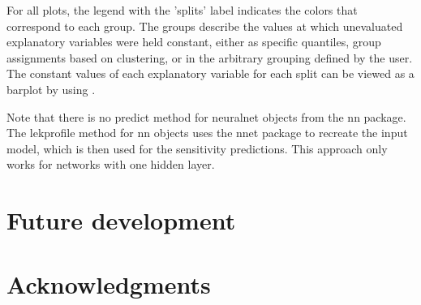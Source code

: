 \documentclass[article]{jss}\usepackage[]{graphicx}\usepackage[]{color}
\begin{document}
For all plots, the legend with the 'splits' label indicates the colors that correspond to each group. The groups describe the values at which unevaluated explanatory variables were held constant, either as specific quantiles, group assignments based on clustering, or in the arbitrary grouping defined by the user. The constant values of each explanatory variable for each split can be viewed as a barplot by using .

Note that there is no predict method for neuralnet objects from the nn package. The lekprofile method for nn objects uses the nnet package to recreate the input model, which is then used for the sensitivity predictions. This approach only works for networks with one hidden layer.


\section[Future development]{Future development}

\section[Acknowledgments]{Acknowledgments}



\end{document}
